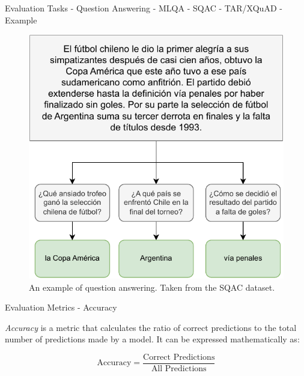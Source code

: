\documentclass[aspectratio=169,xcolor=dvipsnames]{beamer}
\begin{document}
\begin{frame}{Evaluation Tasks - Question Answering - MLQA - SQAC - TAR/XQuAD - Example}

\centering
\begin{figure}
    \includegraphics[scale=0.57]{images/nlp-example-question-answering.pdf}
    \caption{An example of question answering. Taken from the SQAC \citep{gutierrezfandino2022-roberta-bne} dataset.}
    \label{fig:nlp-example-question-answering}
\end{figure}

\end{frame}
\begin{frame}{Evaluation Metrics - Accuracy}

\textit{Accuracy} is a metric that calculates the ratio of correct predictions to the total number of predictions made by a model. It can be expressed mathematically as:

$$\text{Accuracy} = \frac{\text{Correct Predictions}}{\text{All Predictions}}$$

\end{frame}
\end{document}
